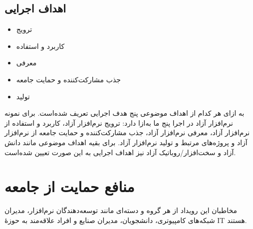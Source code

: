 \documentclass{article}
\begin{document}
\subsection{اهداف اجرایی}

\begin{flushright}
\begin{itemize}
\item ترویج
\item کاربرد و استفاده
\item معرفی
\item جذب مشارکت‌کننده و حمایت جامعه
\item تولید
\end{itemize}
\end{flushright}

به ازای هر کدام از اهداف موضوعی پنج هدف اجرایی تعریف شده‌است. برای نمونه نرم‌افزار آزاد در اجرا پنج ما به‌ازا دارد: ترویج نرم‌افزار آزاد، کاربرد و استفاده از نرم‌افزار آزاد، معرفی نرم‌افزار آزاد، جذب مشارکت‌کننده و حمایت جامعه از نرم‌افزار آزاد و پروژه‌های مرتبط و تولید نرم‌افزار آزاد. برای بقیه اهداف موضوعی مانند دانش آزاد و سخت‌افزار/روباتیک آزاد نیز اهداف اجرایی به این صورت تعیین شده‌است.

\section{منافع حمایت از جامعه}
مخاطبان این رویداد از هر گروه و دسته‌ای مانند توسعه‌دهندگان نرم‌افزار، مدیران شبکه‌های کامپیوتری، دانشجویان، مدیران صنایع و افراد علاقه‌مند به حوزهٔ IT  هستند.
\end{document}
